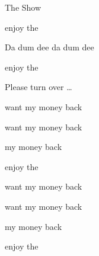 \begin{SBSong}{The Show}
\begin{minipage}[t]{0.6\textwidth}
\begin{SBVerse}
     enjoy the 

    Da dum dee  da dum dee 

     enjoy the 
  \end{SBVerse}
  \ifWordBk
    \hfill {\ChFont Please turn over \dots}
  \fi
  \end{minipage}
  \begin{minipage}[t]{0.4\textwidth}
  \begin{SBVerse}
     want my money back

     want my money back

     my money back
    
     enjoy the 
  \end{SBVerse}
  \begin{SBVerse}
     want my money back

     want my money back

     my money back


     enjoy the 
  \end{SBVerse}
  \end{minipage}
\end{SBSong}

